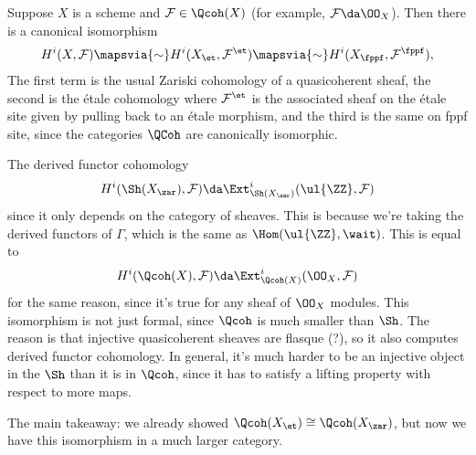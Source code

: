\begin{theorem}[?]

Suppose \(X\) is a scheme and \(\mathcal{F}\in \Qcoh(X)\) (for example,
\(\mathcal{F} \da \OO_X\)). Then there is a canonical isomorphism
\begin{align*}  
H^i(X, \mathcal{F}) \mapsvia{\sim} H^i(X_\et, \mathcal{F}^{\et}) \mapsvia{\sim} H^i(X_{\fppf}, \mathcal{F}^{\fppf})
,\end{align*} The first term is the usual Zariski cohomology of a
quasicoherent sheaf, the second is the étale cohomology where
\(\mathcal{F}^{\et}\) is the associated sheaf on the étale site given by
pulling back to an étale morphism, and the third is the same on fppf
site, since the categories \(\QCoh\) are canonically isomorphic.

\end{theorem}

\begin{remark}

The derived functor cohomology
\begin{align*}
H^i(\Sh(X_{\zar}), \mathcal{F}) \da \Ext^i_{\Sh(X_\zar)}(\ul{\ZZ}, \mathcal{F})
\end{align*} since it only depends on the category of sheaves. This is
because we're taking the derived functors of \(\Gamma\), which is the
same as \(\Hom(\ul{\ZZ}, \wait)\). This is equal to
\begin{align*}
H^i(\Qcoh(X), \mathcal{F}) \da \Ext^i_{\Qcoh(X)}(\OO_X, \mathcal{F})
\end{align*} for the same reason, since it's true for any sheaf of
\(\OO_X\) modules. This isomorphism is not just formal, since \(\Qcoh\)
is much smaller than \(\Sh\). The reason is that injective quasicoherent
sheaves are flasque (?), so it also computes derived functor cohomology.
In general, it's much harder to be an injective object in the \(\Sh\)
than it is in \(\Qcoh\), since it has to satisfy a lifting property with
respect to more maps.

The main takeaway: we already showed
\(\Qcoh(X_\et) \cong \Qcoh(X_\zar)\), but now we have this isomorphism
in a much larger category.

\end{remark}

